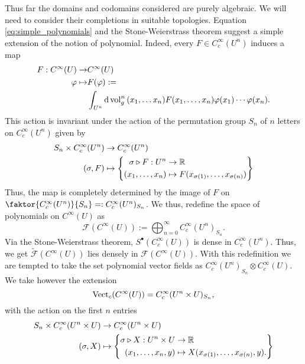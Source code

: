 Thus far the domains and codomains considered are purely algebraic. We will need to consider their completions in suitable topologies. Equation \eqref{eq:simple_polynomials} and the Stone-Weierstrass theorem suggest a simple extension of the notion of polynomial. Indeed, every $F\in C^\infty_c(U^n)$ induces a map
\begin{equation}
\begin{aligned}
F:C^\infty(U)\rightarrow&C^\infty(U)\\
\varphi\mapsto&F(\varphi):=\\
&\int_{U^n}\dd{\operatorname{vol}_g^n}(x_1,\dots x_n)F(x_1,\dots,x_n)\varphi(x_1)\cdots\varphi(x_n).
\end{aligned}
\end{equation}
This action is invariant under the action of the permutation group $S_n$ of $n$ letters on $C^\infty_c(U^n)$ given by
\begin{equation}
\begin{aligned}
S_n\times C^\infty_c(U^n)&\rightarrow C^\infty_c(U^n)\\
(\sigma,F)&\mapsto\qty{\begin{aligned}
\sigma\triangleright F:U^n&\rightarrow\mathbb{R}\\
(x_1,\dots,x_n)&\mapsto F(x_{\sigma(1)},\dots,x_{\sigma(n)})
\end{aligned}}
\end{aligned}
\end{equation} 
Thus, the map is completely determined by the image of $F$ on $\faktor{C^\infty_c(U^n)}{S_n}=:C^\infty_c(U^n)_{S_n}$. We thus, redefine the space of polynomials on $C^\infty(U)$ as 
\begin{equation}
\mathcal{F}(C^\infty(U)):=\bigoplus_{n=0}^\infty C^\infty_c(U^n)_{S_n}.
\end{equation}
Via the Stone-Weierstrass theorem, $S^\bullet(C^\infty_c(U))$ is dense in $C^\infty_c(U^n)$. Thus, we get $\tilde{\mathcal{F}}(C^\infty(U))$ lies densely in $\mathcal{F}(C^\infty(U))$. With this redefinition we are tempted to take the set polynomial vector fields as $C^\infty_c(U^n)_{S_n}\otimes C^\infty_c(U)$. We take however the extension
\begin{equation}
\operatorname{Vect}_c(C^\infty(U))=C^\infty_c(U^n\times U)_{S_n},
\end{equation}
with the action on the first $n$ entries
\begin{equation}
\begin{aligned}
S_n\times C^\infty_c(U^n\times U)&\rightarrow C^\infty_c(U^n\times U)\\
(\sigma,X)&\mapsto\qty{\begin{aligned}
\sigma\triangleright X:U^n\times U&\rightarrow\mathbb{R}\\
(x_1,\dots,x_n,y)&\mapsto X(x_{\sigma(1)},\dots,x_{\sigma(n)},y).
\end{aligned}}
\end{aligned}
\end{equation} 

